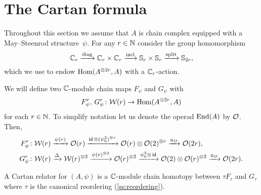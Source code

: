 
\section{The Cartan formula}\label{s:cartan}

Throughout this section we assume that $A$ is chain complex equipped with a May--Steenrod structure~$\psi$.
For any $r \in \mathbb{N}$ consider the group homomorphism
\begin{equation}\label{eq:cyclic to 2-symetric}
	\mathbb{C}_r \xrightarrow{\mathrm{diag}} \mathbb{C}_r \times \mathbb{C}_r \xrightarrow{\mathrm{incl}} \mathbb{S}_r \times \mathbb{S}_r \xrightarrow{\mathrm{split}} \mathbb{S}_{2r},
\end{equation}
which we use to endow $\mathrm{Hom}(A^{\otimes 2r}, A)$ with a $\mathbb{C}_r$-action.

We will define two $\mathbb{C}$-module chain maps $F_\psi$ and $G_\psi$ with
\[
F_\psi^r,\, G_\psi^r \colon \mathcal{W}(r) \to \mathrm{Hom}(A^{\otimes 2r}, A)
\]
for each $r \in \mathbb{N}$.
To simplify notation let us denote the operad $\mathrm{End}(A)$ by $\mathcal{O}$.
Then,
\begin{align*}
	F_\psi^r \colon& \mathcal{W}(r) \xrightarrow{\psi(r)} \mathcal{O}(r) \xrightarrow{\mathsf{id}\, \otimes (\psi_0^2)^{\otimes r}}
	\mathcal{O}(r) \otimes \mathcal{O}(2)^{\otimes r} \xrightarrow{\bm{\circ}_{\mathcal{O}}}
	\mathcal{O}(2r), \\
	G_\psi^r \colon& \mathcal{W}(r) \xrightarrow{\Delta}
	\mathcal{W}(r)^{\otimes 2} \xrightarrow{\psi(r)^{\otimes 2}}
	\mathcal{O}(r)^{\otimes 2} \xrightarrow{\psi_0^2 \otimes\, \mathsf{id}}
	\mathcal{O}(2) \otimes \mathcal{O}(r)^{\otimes 2} \xrightarrow{\bm{\circ}_{\mathcal{O}}}
	\mathcal{O}(2r).
\end{align*}

\begin{definition}
	A Cartan relator for $(A, \psi)$ is a $\mathbb{C}$-module chain homotopy between $\tau F_\tau$ and $G_\tau$ where $\tau$ is the canonical reordering (\cref{ss:reordering}).
\end{definition}

